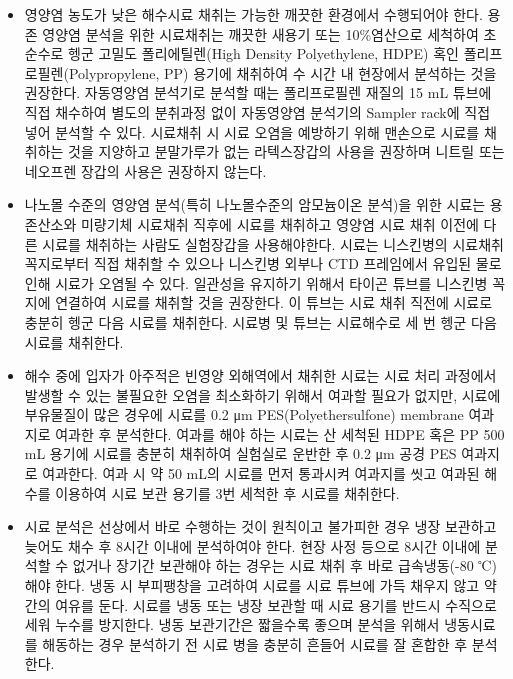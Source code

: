 \documentclass[
]{book}
\providecommand{\tightlist}{%
  \setlength{\itemsep}{0pt}\setlength{\parskip}{0pt}}
\begin{document}
\begin{itemize}
\tightlist
\item
  영양염 농도가 낮은 해수시료 채취는 가능한 깨끗한 환경에서 수행되어야 한다. 용존 영양염 분석을 위한 시료채취는 깨끗한 새용기 또는 10\%염산으로 세척하여 초순수로 헹군 고밀도 폴리에틸렌(High Density Polyethylene, HDPE) 혹인 폴리프로필렌(Polypropylene, PP) 용기에 채취하여 수 시간 내 현장에서 분석하는 것을 권장한다. 자동영양염 분석기로 분석할 때는 폴리프로필렌 재질의 15 mL 튜브에 직접 채수하여 별도의 분취과정 없이 자동영양염 분석기의 Sampler rack에 직접 넣어 분석할 수 있다. 시료채취 시 시료 오염을 예방하기 위해 맨손으로 시료를 채취하는 것을 지양하고 분말가루가 없는 라텍스장갑의 사용을 권장하며 니트릴 또는 네오프렌 장갑의 사용은 권장하지 않는다.
\item
  나노몰 수준의 영양염 분석(특히 나노몰수준의 암모늄이온 분석)을 위한 시료는 용존산소와 미량기체 시료채취 직후에 시료를 채취하고 영양염 시료 채취 이전에 다른 시료를 채취하는 사람도 실험장갑을 사용해야한다. 시료는 니스킨병의 시료채취 꼭지로부터 직접 채취할 수 있으나 니스킨병 외부나 CTD 프레임에서 유입된 물로 인해 시료가 오염될 수 있다. 일관성을 유지하기 위해서 타이곤 튜브를 니스킨병 꼭지에 연결하여 시료를 채취할 것을 권장한다. 이 튜브는 시료 채취 직전에 시료로 충분히 헹군 다음 시료를 채취한다. 시료병 및 튜브는 시료해수로 세 번 헹군 다음 시료를 채취한다.
\item
  해수 중에 입자가 아주적은 빈영양 외해역에서 채취한 시료는 시료 처리 과정에서 발생할 수 있는 불필요한 오염을 최소화하기 위해서 여과할 필요가 없지만, 시료에 부유물질이 많은 경우에 시료를 0.2 μm PES(Polyethersulfone) membrane 여과지로 여과한 후 분석한다. 여과를 해야 하는 시료는 산 세척된 HDPE 혹은 PP 500 mL 용기에 시료를 충분히 채취하여 실험실로 운반한 후 0.2 μm 공경 PES 여과지로 여과한다. 여과 시 약 50 mL의 시료를 먼저 통과시켜 여과지를 씻고 여과된 해수를 이용하여 시료 보관 용기를 3번 세척한 후 시료를 채취한다.
\item
  시료 분석은 선상에서 바로 수행하는 것이 원칙이고 불가피한 경우 냉장 보관하고 늦어도 채수 후 8시간 이내에 분석하여야 한다. 현장 사정 등으로 8시간 이내에 분석할 수 없거나 장기간 보관해야 하는 경우는 시료 채취 후 바로 급속냉동(-80 ℃)해야 한다. 냉동 시 부피팽창을 고려하여 시료를 시료 튜브에 가득 채우지 않고 약간의 여유를 둔다. 시료를 냉동 또는 냉장 보관할 때 시료 용기를 반드시 수직으로 세워 누수를 방지한다. 냉동 보관기간은 짧을수록 좋으며 분석을 위해서 냉동시료를 해동하는 경우 분석하기 전 시료 병을 충분히 흔들어 시료를 잘 혼합한 후 분석한다.
\end{itemize}
\end{document}
